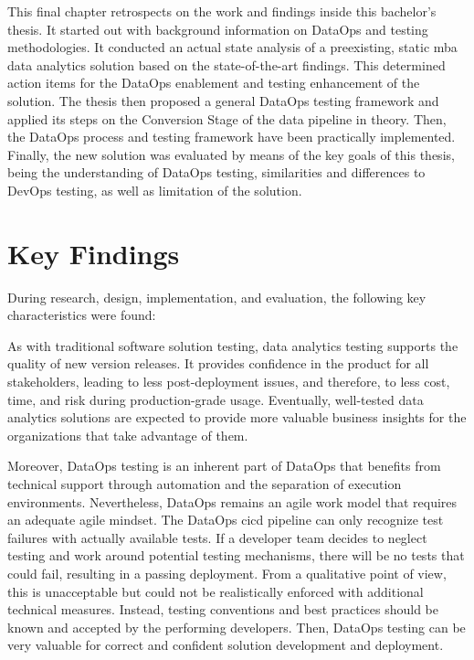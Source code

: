 
This final chapter retrospects on the work and findings inside this bachelor's thesis. It started out with background information on DataOps and testing methodologies. It conducted an actual state analysis of a preexisting, static \ac{mba} data analytics solution based on the state-of-the-art findings. This determined action items for the DataOps enablement and testing enhancement of the solution. The thesis then proposed a general DataOps testing framework and applied its steps on the Conversion Stage of the data pipeline in theory. Then, the DataOps process and testing framework have been practically implemented. Finally, the new solution was evaluated by means of the key goals of this thesis, being the understanding of DataOps testing, similarities and differences to DevOps testing, as well as limitation of the solution.

\section*{Key Findings} \addtocounter{section}{1}
During research, design, implementation, and evaluation, the following key characteristics were found:

As with traditional software solution testing, data analytics testing supports the quality of new version releases. It provides confidence in the product for all stakeholders, leading to less post-deployment issues, and therefore, to less cost, time, and risk during production-grade usage. Eventually, well-tested data analytics solutions are expected to provide more valuable business insights for the organizations that take advantage of them.

Moreover, DataOps testing is an inherent part of DataOps that benefits from technical support through automation and the separation of execution environments. Nevertheless, DataOps remains an agile work model that requires an adequate agile mindset. The DataOps \ac{cicd} pipeline can only recognize test failures with actually available tests. If a developer team decides to neglect testing and work around potential testing mechanisms, there will be no tests that could fail, resulting in a passing deployment. From a qualitative point of view, this is unacceptable but could not be realistically enforced with additional technical measures. Instead, testing conventions and best practices should be known and accepted by the performing developers. Then, DataOps testing can be very valuable for correct and confident solution development and deployment.

